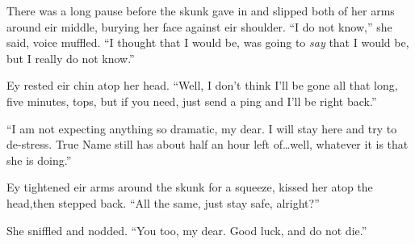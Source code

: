 There was a long pause before the skunk gave in and slipped both of her arms around eir middle, burying her face against eir shoulder. ``I do not know,'' she said, voice muffled. ``I thought that I would be, was going to \emph{say} that I would be, but I really do not know.''

Ey rested eir chin atop her head. ``Well, I don't think I'll be gone all that long, five minutes, tops, but if you need, just send a ping and I'll be right back.''

``I am not expecting anything so dramatic, my dear. I will stay here and try to de-stress. True Name still has about half an hour left of\ldots well, whatever it is that she is doing.''

Ey tightened eir arms around the skunk for a squeeze, kissed her atop the head,then stepped back. ``All the same, just stay safe, alright?''

She sniffled and nodded. ``You too, my dear. Good luck, and do not die.''
